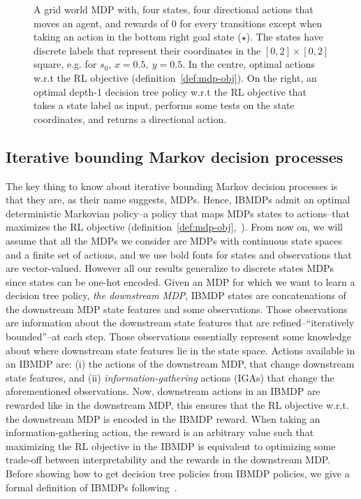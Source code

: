\begin{figure}
{}
    \caption{A grid world MDP with, four states, four directional actions that moves an agent, and rewards of 0 for every transitions except when taking an action in the bottom right goal state ($\star$).
    The states have discrete labels that represent their coordinates in the $[0,2]\times[0,2]$ square, e.g. for $s_0$, $x=0.5,\ y=0.5$. In the centre, optimal actions w.r.t the RL objective (definition~\ref{def:mdp-obj}).
    On the right, an optimal depth-1 decision tree policy w.r.t the RL objective that takes a state label as input, performs some tests on the state coordinates, and returns a directional action.}\label{fig:mdp-dt}
    \end{figure}

\subsection{Iterative bounding Markov decision processes}\label{sec:ibmdp}
The key thing to know about iterative bounding Markov decision processes is that they are, as their name suggests, MDPs.
Hence, IBMDPs admit an optimal deterministic Markovian policy--a policy that maps MDPs states to actions--that maximizes the RL objective (definition~\ref{def:mdp-obj},~\cite{Bellman,puterman}).
From now on, we will assume that all the MDPs we consider are MDPs with continuous state spaces and a finite set of actions, and we use bold fonts for states and observations that are vector-valued.
However all our results generalize to discrete states MDPs since states can be one-hot encoded.
Given an MDP for which we want to learn a decision tree policy, \textit{the downstream MDP}, IBMDP states are concatenations of the downstream MDP state features and some observations.
Those observations are information about the downstream state features that are refined--``iteratively bounded''--at each step.
Those observations essentially represent some knowledge about where downstream state features lie in the state space.
Actions available in an IBMDP are: (i) the actions of the downstream MDP, that change downstream state features, and (ii) \textit{information-gathering} actions (IGAs) that change the aforementioned observations.
Now, downstream actions in an IBMDP are rewarded like in the downstream MDP, this ensures that the RL objective w.r.t. the downstream MDP is encoded in the IBMDP reward.
When taking an information-gathering action, the reward is an arbitrary value such that maximizing the RL objective in the IBMDP is equivalent to optimizing some trade-off between interpretability and the rewards in the downstream MDP.
Before showing how to get decision tree policies from IBMDP policies, we give a formal definition of IBMDPs following~\cite{topin2021iterative}.

